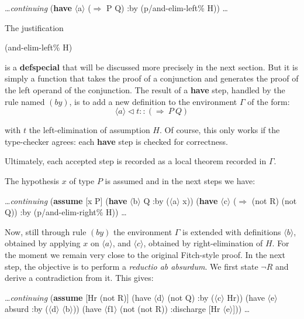 \documentclass{styles/sig-alternate-05-2015}
\newcommand{\kw}[1]{\textbf{#1}}
\newcommand{\cmt}[1]{\textit{#1}}
\newcommand{\code}[1]{\begin{sffamily}{\small #1}\end{sffamily}}
\begin{document}
\begin{program}
    \ldots \cmt{continuing}
    (\kw{have} $\langle$a$\rangle$ ($\Longrightarrow$ P Q) :by (p/and-elim-left\% H))
    \ldots
\end{program}

The justification \code{(and-elim-left\% H)}
is a \kw{defspecial} that will be discussed
  more precisely in the next section. But it is simply a function that takes the proof of
  a conjunction and generates the proof of the left operand of the conjunction.
  The result of a \kw{have} step, handled by the rule named $(by)$, is to add a new definition to the environment $\Gamma$ of the
  form:
$$\langle a \rangle \triangleleft t :: (\Longrightarrow~P~Q)$$

  with $t$ the left-elimination of assumption $H$. Of course, this only works if the type-checker agrees: each \kw{have} step is checked for correctness.

  Ultimately, each accepted step is recorded as a local theorem recorded in $\Gamma$.

  The hypothesis $x$ of type $P$ is assumed and in the next steps we have:

\begin{program}
    \ldots \cmt{continuing}
    (\kw{assume} [x P]
      (\kw{have} $\langle$b$\rangle$ Q :by ($\langle$a$\rangle$ x))
      (\kw{have} $\langle$c$\rangle$ ($\Longrightarrow$ (not R) (not Q))
            :by (p/and-elim-right\% H))
        \ldots
\end{program}

Now, still through rule $(by)$ the environment $\Gamma$ is extended with definitions $\langle b \rangle$, obtained by applying $x$ on $\langle a \rangle$, and $\langle c \rangle$, obtained by right-elimination of $H$. For the moment we remain very close to the original Fitch-style proof. In the next step, the objective is to perform a \emph{reductio ab absurdum}. We first state $\lnot R$ and derive a contradiction from it. This gives:

\begin{program}
        \ldots \cmt{continuing}
        (\kw{assume} [Hr (not R)]
          (have $\langle$d$\rangle$ (not Q) :by ($\langle$c$\rangle$ Hr))
          (have $\langle$e$\rangle$ absurd :by ($\langle$d$\rangle$ $\langle$b$\rangle$))
          (have $\langle$f1$\rangle$ (not (not R))
                :discharge [Hr $\langle$e$\rangle$]))
        \ldots
\end{program}
\end{document}
